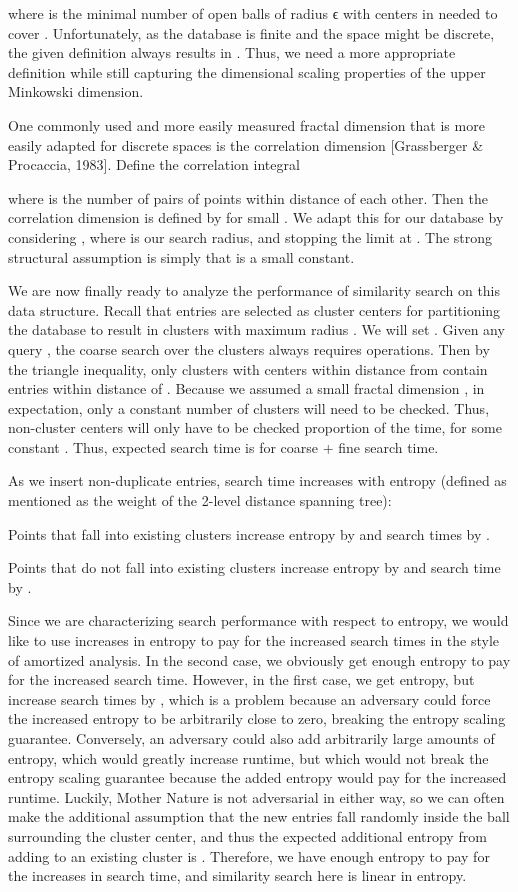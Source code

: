 \documentclass{amsbook}
\theoremstyle{definition}
\theoremstyle{remark}
\numberwithin{equation}{section}
\begin{document}
where  is the minimal number of open balls of radius ϵ with centers in  needed to cover .
Unfortunately, as the database is finite and the space might be discrete, the given definition always results in .
Thus, we need a more appropriate definition while still capturing the dimensional scaling properties of the upper Minkowski dimension.

One commonly used and more easily measured fractal dimension that is more easily adapted for discrete spaces is the correlation dimension [Grassberger \& Procaccia, 1983].
Define the correlation integral



where  is the number of pairs of points within distance  of each other.
Then the correlation dimension  is defined by  for small .
We adapt this for our database by considering , where  is our search radius, and stopping the limit at .
The strong structural assumption is simply that  is a small constant.

We are now finally ready to analyze the performance of similarity search on this data structure.
Recall that  entries are selected as cluster centers for partitioning the database to result in clusters with maximum radius .
We will set  .
Given any query , the coarse search over the clusters always requires  operations.
Then by the triangle inequality, only clusters with centers within distance  from  contain entries within distance  of .
Because we assumed a small fractal dimension , in expectation, only a constant number of clusters will need to be checked.
Thus, non-cluster centers will only have to be checked  proportion of the time, for some constant .
Thus, expected search time is  for coarse + fine search time.

As we insert non-duplicate entries, search time increases with entropy (defined as mentioned as the weight of the 2-level distance spanning tree):

Points that fall into existing clusters increase entropy by  and search times by .

Points that do not fall into existing clusters increase entropy by  and search time by .

Since we are characterizing search performance with respect to entropy, we would like to use increases in entropy to pay for the increased search times in the style of amortized analysis.
In the second case, we obviously get enough entropy to pay for the increased search time.
However, in the first case, we get  entropy, but increase search times by , which is a problem because an adversary could force the increased entropy to be arbitrarily close to zero, breaking the entropy scaling guarantee.
Conversely, an adversary could also add arbitrarily large amounts of entropy, which would greatly increase runtime, but which would not break the entropy scaling guarantee because the added entropy would pay for the increased runtime.
Luckily, Mother Nature is not adversarial in either way, so we can often make the additional assumption that the new entries fall randomly inside the ball surrounding the cluster center, and thus the expected additional entropy from adding to an existing cluster is .
Therefore, we have enough entropy to pay for the increases in search time, and similarity search here is linear in entropy.
\end{document}

